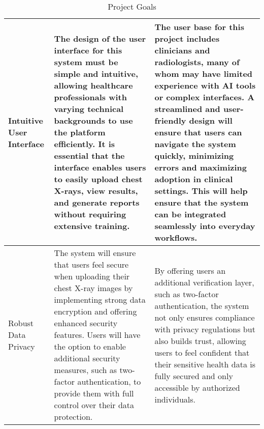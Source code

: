 \documentclass{article}
\begin{document}
\begin{table}[H]
\begin{tabular}{|p{3cm}|p{6cm}|p{6cm}|}
    Intuitive User Interface & The design of the user interface for this system must be simple and intuitive, allowing healthcare professionals with varying technical backgrounds to use the platform efficiently. It is essential that the interface enables users to easily upload chest X-rays, view results, and generate reports without requiring extensive training. &The user base for this project includes clinicians and radiologists, many of whom may have limited experience with AI tools or complex interfaces. A streamlined and user-friendly design will ensure that users can navigate the system quickly, minimizing errors and maximizing adoption in clinical settings. This will help ensure that the system can be integrated seamlessly into everyday workflows.  \\ \hline
    
    Robust Data Privacy  & The system will ensure that users feel secure when uploading their chest X-ray images by implementing strong data encryption and offering enhanced security features. Users will have the option to enable additional security measures, such as two-factor authentication, to provide them with full control over their data protection. & By offering users an additional verification layer, such as two-factor authentication, the system not only ensures compliance with privacy regulations but also builds trust, allowing users to feel confident that their sensitive health data is fully secured and only accessible by authorized individuals. \\ \hline
    \end{tabular}
    \caption{Project Goals}
\end{table}
\end{document}
